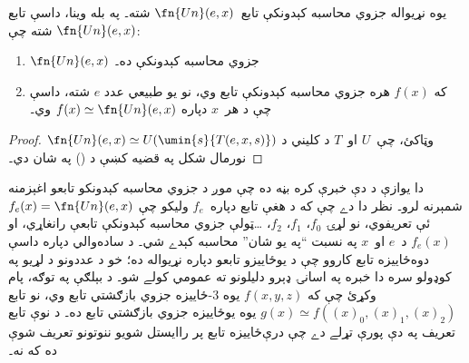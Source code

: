 \documentclass[../../../include/open-logic-section]{subfiles}
\begin{document}

\begin{thm}
يوه نړيواله جزوي محاسبه کېدونکې تابع~$\fn{Un}(e,x)$ شته۔ په بله
وينا، داسې تابع $\fn{Un}(e,x)$ شته چې:
\begin{enumerate}
\item $\fn{Un}(e,x)$ جزوي محاسبه کېدونکې ده۔
\item که $f(x)$ هره جزوي محاسبه کېدونکې تابع وي، نو يو طبيعي عدد
$e$ شته، داسې چې د هر~$x$ دپاره $f(x) \simeq \fn{Un}(e,x)$ وي۔
\end{enumerate}
\end{thm}

\begin{proof}
$\fn{Un}(e,x) \simeq U(\umin{s}{T(e,x,s)})$ وټاکئ، چې~$U$ او~$T$
د کليني د نورمال شکل په قضيه کښې د
() په شان دي۔
\end{proof}

\begin{explain}
دا يوازې د دې خبرې کره بڼه ده چې موږ د جزوي محاسبه کېدونکو تابعو
اغېزمنه شمېرنه لرو۔ نظر دا دے چې که د هغې تابع دپاره~$f_e$ وليکو چې
$f_e(x) = \fn{Un}(e,x)$ ئې تعريفوي، نو لړۍ $f_0$، $f_1$، $f_2$،
\dots ټولې جزوي محاسبه کېدونکې تابعې رانغاړي، او $f_e(x)$ د~$e$
او~$x$ په نسبت ``په يو شان'' محاسبه کېدے شي۔ د ساده‌والي دپاره داسې
دوه‌ځاييزه تابع کاروو چې د يوځاييزو تابعو دپاره نړيواله ده؛ خو د
عددونو د لړيو په کوډولو سره دا خبره په اسانۍ ډېرو دليلونو ته عمومي
کولے شو۔ د بېلګې په توګه، پام وکړئ چې که $f(x,y,z)$ يوه $3$-ځاييزه
جزوي بازګشتي تابع وي، نو تابع
$g(x) \simeq f((x)_0, (x)_1, (x)_2)$ يوه يوځاييزه جزوي بازګشتي
تابع ده۔
د نوې تابع تعريف په دې پورې تړلے دے چې درې‌ځاييزه تابع پر راايستل شويو ننوتونو تعريف شوې ده که نه۔
\end{explain}
\end{document}

